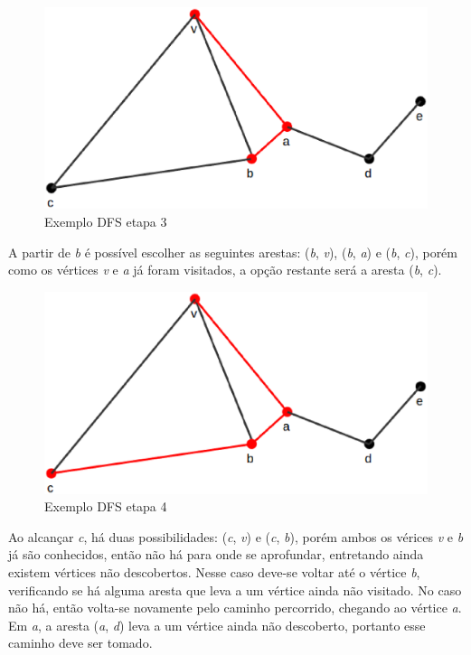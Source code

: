 \begin{figure}[!h]
	\centering
	\includegraphics[scale=0.25]{figuras/capitulo2/dfs/dfs3.eps}
	\caption{Exemplo DFS etapa 3}
	\label{dfs3}
\end{figure}

A partir de \textit{b} é possível escolher as seguintes arestas: (\textit{b}, \textit{v}), (\textit{b}, \textit{a}) e (\textit{b}, \textit{c}), porém como os vértices \textit{v} e \textit{a} já foram visitados, a opção restante será a aresta (\textit{b}, \textit{c}).

\begin{figure}[!h]
	\centering
	\includegraphics[scale=0.25]{figuras/capitulo2/dfs/dfs4.eps}
	\caption{Exemplo DFS etapa 4}
	\label{dfs4}
\end{figure}

Ao alcançar \textit{c}, há duas possibilidades: (\textit{c}, \textit{v}) e (\textit{c}, \textit{b}), porém ambos os vérices \textit{v} e \textit{b} já são conhecidos, então não há para onde se aprofundar, entretando ainda existem vértices não descobertos. Nesse caso deve-se voltar até o vértice \textit{b}, verificando se há alguma aresta que leva a um vértice ainda não visitado. No caso não há, então volta-se novamente pelo caminho percorrido, chegando ao vértice \textit{a}. Em \textit{a}, a aresta (\textit{a}, \textit{d}) leva a um vértice ainda não descoberto, portanto esse caminho deve ser tomado.

